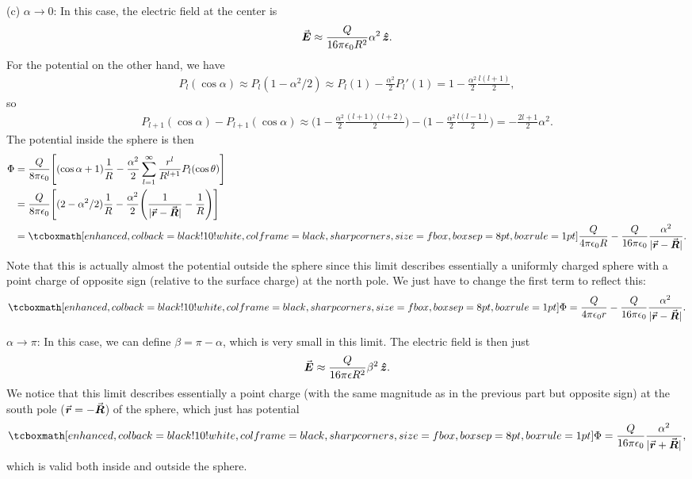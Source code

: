{(c) $\alpha \rightarrow 0$: In this case, the electric field at the center is
\begin{eqnarray}
    \va*{E} \approx \frac{Q}{16 \pi \epsilon_0 R^2} \alpha^2 \, \vu*{z}
.\end{eqnarray}
For the potential on the other hand, we have
\begin{eqnarray}
    P_{l}(\cos{\alpha}) \approx P_{l}(1 - \alpha^2/2) \approx P_{l}(1) - \frac{\alpha^2}{2} P_{l}'(1) = 1 - \frac{\alpha^2}{2} \frac{l(l+1)}{2}
,\end{eqnarray}
so
\begin{eqnarray}
    P_{l+1}(\cos{\alpha}) - P_{l+1}(\cos{\alpha}) \approx \Big( 1 - \frac{\alpha^2}{2} \frac{(l+1)(l+2)}{2} \Big) - \Big( 1 - \frac{\alpha^2}{2} \frac{l(l-1)}{2} \Big) = -\frac{2l+1}{2} \alpha^2
.\end{eqnarray}
The potential inside the sphere is then
\begin{eqnarray}
    \begin{aligned}
        \Phi &= \frac{Q}{8 \pi \epsilon_0} \Bigg[ (\cos{\alpha} + 1) \frac{1}{R} - \frac{\alpha^2}{2} \sum_{l=1}^{\infty} \frac{r^{l}}{R^{l+1}} P_{l}(\cos{\theta}) \Bigg] \\
             &= \frac{Q}{8 \pi \epsilon_0} \Bigg[ (2 - \alpha^2/2) \frac{1}{R} - \frac{\alpha^2}{2} \Bigg( \frac{1}{|\va*{r} - \va*{R}|} - \frac{1}{R} \Bigg) \Bigg] \\
             &= \eqbox{ \frac{Q}{4 \pi \epsilon_0 R} - \frac{Q}{16 \pi \epsilon_0} \frac{\alpha^2}{|\va*{r} - \va*{R}|} }
    .\end{aligned}
\end{eqnarray}
Note that this is actually almost the potential outside the sphere since this limit describes essentially a uniformly charged sphere with a point charge of opposite sign (relative to the surface charge) at the north pole.
We just have to change the first term to reflect this:
\begin{eqnarray}
    \eqbox{ \Phi = \frac{Q}{4 \pi \epsilon_0 r} - \frac{Q}{16 \pi \epsilon_0} \frac{\alpha^2}{|\va*{r} - \va*{R}|} }
.\end{eqnarray}

$\alpha \rightarrow \pi$:
In this case, we can define $\beta = \pi - \alpha$, which is very small in this limit.
The electric field is then just
\begin{eqnarray}
    \va*{E} \approx \frac{Q}{16 \pi \epsilon R^2} \beta^2 \, \vu*{z}
.\end{eqnarray}
We notice that this limit describes essentially a point charge (with the same magnitude as in the previous part but opposite sign) at the south pole ($\va*{r} = -\va*{R}$) of the sphere, which just has potential
\begin{eqnarray}
    \eqbox{ \Phi = \frac{Q}{16 \pi \epsilon_0} \frac{\alpha^2}{|\va*{r} + \va*{R}|} }
,\end{eqnarray}
which is valid both inside and outside the sphere.

}


